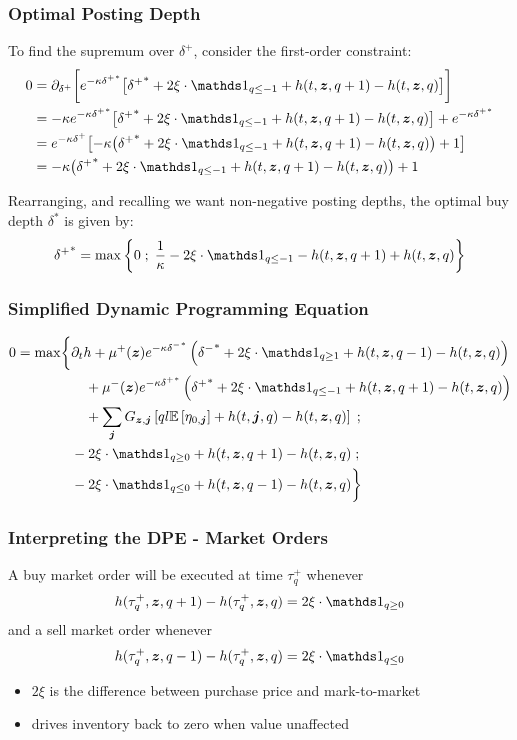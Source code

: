 \begin{frame}
\frametitle{Optimal Posting Depth}
To find the supremum over $\delta^+$, consider the first-order constraint:
\begin{align*}
0 & = \partial_{\delta^+} \biggl[ e^{ -\kappa {\delta^+}^*} \bigl[ {\delta^+}^* +  2 \xi \cdot \indicator_{q \leq -1} + h(t,\bz,q+1) - h(t,\bz,q) \bigr] \biggr] \\
& = -\kappa e^{ -\kappa {\delta^+}^*} \bigl[ {\delta^+}^* +2 \xi \cdot \indicator_{q \leq -1} + h(t,\bz,q+1) - h(t,\bz,q) \bigr] + e^{ -\kappa {\delta^+}^*} \\
& = e^{ -\kappa \delta^{+}} \bigl[ -\kappa \bigl( {\delta^+}^* +2 \xi \cdot \indicator_{q \leq -1} + h(t,\bz,q+1) - h(t,\bz,q) \bigr) + 1 \bigr] \\
& = -\kappa \bigl( {\delta^+}^* +2 \xi \cdot \indicator_{q \leq -1} + h(t,\bz,q+1) - h(t,\bz,q) \bigr) + 1 \\
\end{align*}

Rearranging, and recalling we want non-negative posting depths, the optimal buy depth $\delta^*$ is given by:
\[ {\delta^+}^* = \max \left\lbrace 0 \; ; \; \frac{1}{\kappa} - 2 \xi \cdot \indicator_{q \leq -1} - h(t,\bz,q+1) + h(t,\bz,q) \right\rbrace \] 
\end{frame}

\begin{frame}
\frametitle{Simplified Dynamic Programming Equation}
\[
\begin{aligned}
0 = \max \biggl\lbrace & \partial_t h + \mu^+(\bz) e^{ -\kappa {\delta^-}^*} \left( {\delta^-}^* + 2\xi \cdot \indicator_{q \geq 1} + h(t,\bz,q-1) - h(t,\bz,q) \right)  \\
& \quad + \mu^-(\bz) e^{ -\kappa {\delta^+}^*} \left( {\delta^+}^* + 2 \xi \cdot \indicator_{q \leq -1} + h(t,\bz,q+1) - h(t,\bz,q) \right) \\
& \quad + \sum_{\bj} G_{\bz,\bj} \left[ ql \E \left[ \eta_{0,\bj} \right] + h(t,\bj,q) - h(t,\bz,q) \right] \; ; \\
& -2 \xi \cdot \indicator_{q \geq 0} + h(t, \bz, q+1) - h(t,\bz,q)   \; ; \\
& -2 \xi \cdot \indicator_{q \leq 0} + h(t, \bz, q-1) - h(t,\bz,q)  \biggr\rbrace
\end{aligned}
\]
\end{frame}

\begin{frame}
\frametitle{Interpreting the DPE - Market Orders}
A buy market order will be executed at time $\tau^+_q$ whenever
\[
h(\tau^+_q, \bz, q+1) - h(\tau^+_q,\bz,q) = 2 \xi \cdot \indicator_{q \geq 0}
\]
and a sell market order whenever
\[
h(\tau^+_q, \bz, q-1) - h(\tau^+_q,\bz,q) = 2 \xi \cdot \indicator_{q \leq 0}
\]
\begin{itemize}
\item $2\xi$ is the difference between purchase price and mark-to-market
\item drives inventory back to zero when value unaffected
\end{itemize}
\end{frame}

